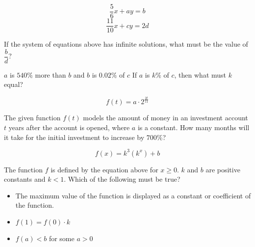 \vspace{1.5em}

\newpage

\noindent\markforreview
\vspace{1em}

\[
\frac{5}{6}x + ay = b
\]
\[
\frac{11}{10}x + cy = 2d
\]

If the system of equations above has infinite solutions, what must be the value of $\dfrac{b}{d}$?

\vspace{1.5em}

\vspace{2em}

\noindent\markforreview
\vspace{1em}

\vspace{1em}

$a$ is $540\%$ more than $b$ and $b$ is $0.02\%$ of $c$
If $a$ is $k\%$ of $c$, then what must $k$ equal?

\newpage

\newpage

\noindent\markforreview
\vspace{1em}

\vspace{1em}

\[
f(t)=a\cdot 2^{\frac{2t}{11}}
\]

The given function $f(t)$ models the amount of money in an investment account $t$ years after the account is opened, where $a$ is a constant.  
How many months will it take for the initial investment to increase by $700\%$?


\vspace{2em}

\vspace{2em}

\noindent\markforreview
\vspace{1em}

\vspace{1em}

\[
f(x)=k^{3}(k^{x})+b
\]

The function $f$ is defined by the equation above for $x\ge 0$.  
$k$ and $b$ are positive constants and $k<1$. Which of the following must be true?

\begin{itemize}
\item[I.] The maximum value of the function is displayed as a constant or coefficient of the function.
\item[II.] $f(1)=f(0)\cdot k$
\item[III.] $f(a)<b$ for some $a>0$
\end{itemize}

